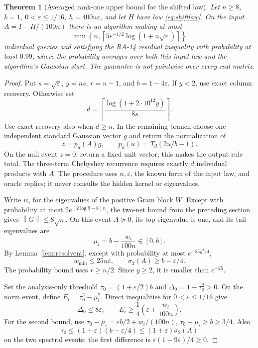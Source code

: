 \documentclass[11pt]{article}
\newtheorem{theorem}{Theorem}[section]
\theoremstyle{definition}
\newcommand{\norm}[1]{\left\lVert#1\right\rVert}
\begin{document}
\begin{theorem}[Averaged rank-one upper bound for the shifted law]\label{thm:ensembleupper}
Let $n\ge8$, $k=1$, $0<\varepsilon\le1/16$, $h=400n\varepsilon$, and let $H$ have law \eqref{eq:shiftlaw}. On the input $A=I-H/(100n)$ there is an algorithm making at most
\begin{equation}\label{eq:ensemblebudget}
\min\left\{n,\left\lceil5\varepsilon^{-1/2}\log(1+n\sqrt\varepsilon)\right\rceil\right\}
\end{equation}
individual queries and satisfying the RA-14 residual inequality with probability at least $0.99$, where the probability averages over both this input law and the algorithm's Gaussian start. The guarantee is not pointwise over every real matrix.
\end{theorem}
\begin{proof}
Put $s=\sqrt\varepsilon$, $y=ns$, $r=n-1$, and $b=1-4\varepsilon$. If $y<2$, use exact column recovery. Otherwise set
\begin{equation}\label{eq:ensembledegree}
d=\left\lceil\frac{\log(1+2\cdot10^{12}y)}{8s}\right\rceil.
\end{equation}
Use exact recovery also when $d\ge n$. In the remaining branch choose one independent standard Gaussian vector $g$ and return the normalization of
\[
z=p_d(A)g,\qquad p_d(u)=T_d(2u/b-1).
\]
On the null event $z=0$, return a fixed unit vector; this makes the output rule total. The three-term Chebyshev recurrence requires exactly $d$ individual products with $A$. The procedure uses $n,\varepsilon$, the known form of the input law, and oracle replies; it never consults the hidden kernel or eigenvalues.

Write $w_i$ for the eigenvalues of the positive Gram block $W$. Except with probability at most $2e^{(2\log9-8)n}$, the two-net bound from the preceding section gives $\norm G\le8\sqrt n$. On this event $A\succeq0$, its top eigenvalue is one, and its tail eigenvalues are
\[
\mu_i=b-\frac{w_i}{100n}\in[0,b].
\]
By Lemma~\ref{lem:resolvent}, except with probability at most $e^{-25y^2/4}$,
\[
w_{\min}\le25n\varepsilon,
\qquad \sigma_2(A)\ge b-\varepsilon/4.
\]
The probability bound uses $r\ge n/2$. Since $y\ge2$, it is smaller than $e^{-25}$.

Set the analysis-only threshold $\tau_0=(1+\varepsilon/2)b$ and $\Delta_0=1-\tau_0^2>0$. On the norm event, define $E_i=\tau_0^2-\mu_i^2$. Direct inequalities for $0<\varepsilon\le1/16$ give
\begin{equation}\label{eq:ensembleconeweights}
\Delta_0\le8\varepsilon,
\qquad E_i\ge\frac14\left(\varepsilon+\frac{w_i}{100n}\right).
\end{equation}
For the second bound, use $\tau_0-\mu_i=\varepsilon b/2+w_i/(100n)$, $\tau_0+\mu_i\ge b\ge3/4$. Also
\begin{equation}\label{eq:thresholdtransfer}
\tau_0\le(1+\varepsilon)(b-\varepsilon/4)\le(1+\varepsilon)\sigma_2(A)
\end{equation}
on the two spectral events: the first difference is $\varepsilon(1-9\varepsilon)/4\ge0$.


\end{proof}
\end{document}

